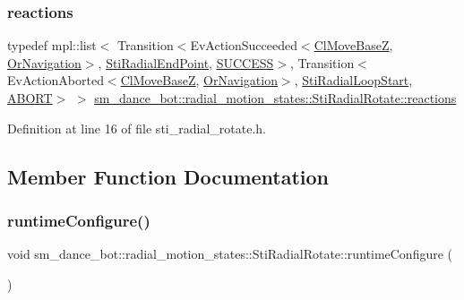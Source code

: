 \subsubsection{\texorpdfstring{reactions}{reactions}}
{\footnotesize\ttfamily typedef mpl\+::list$<$ Transition$<$Ev\+Action\+Succeeded$<$\hyperlink{classmove__base__z__client_1_1ClMoveBaseZ}{Cl\+Move\+BaseZ}, \hyperlink{classsm__dance__bot_1_1OrNavigation}{Or\+Navigation}$>$, \hyperlink{structsm__dance__bot_1_1radial__motion__states_1_1StiRadialEndPoint}{Sti\+Radial\+End\+Point}, \hyperlink{classSUCCESS}{S\+U\+C\+C\+E\+SS}$>$, Transition$<$Ev\+Action\+Aborted$<$\hyperlink{classmove__base__z__client_1_1ClMoveBaseZ}{Cl\+Move\+BaseZ}, \hyperlink{classsm__dance__bot_1_1OrNavigation}{Or\+Navigation}$>$, \hyperlink{structsm__dance__bot_1_1radial__motion__states_1_1StiRadialLoopStart}{Sti\+Radial\+Loop\+Start}, \hyperlink{classABORT}{A\+B\+O\+RT}$>$ $>$ \hyperlink{structsm__dance__bot_1_1radial__motion__states_1_1StiRadialRotate_a9a1ffbc6c684c386ecad126451aa45f8}{sm\+\_\+dance\+\_\+bot\+::radial\+\_\+motion\+\_\+states\+::\+Sti\+Radial\+Rotate\+::reactions}}



Definition at line 16 of file sti\+\_\+radial\+\_\+rotate.\+h.



\subsection{Member Function Documentation}
\mbox{\label{structsm__dance__bot_1_1radial__motion__states_1_1StiRadialRotate_a18e1871865f5385c03068eb7a1ec34a0}} 
\subsubsection{\texorpdfstring{runtime\+Configure()}{runtimeConfigure()}}
{\footnotesize\ttfamily void sm\+\_\+dance\+\_\+bot\+::radial\+\_\+motion\+\_\+states\+::\+Sti\+Radial\+Rotate\+::runtime\+Configure (\begin{DoxyParamCaption}{ }\end{DoxyParamCaption})\hspace{0.3cm}{\ttfamily [inline]}}




